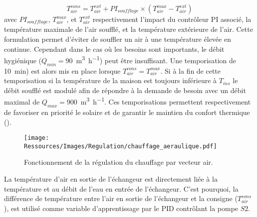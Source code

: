 \begin{equation}\label{eq:temp_soufflage}
    T_{air}^{cons} = T_{air}^{ext} + PI_{soufflage} \times (T_{air}^{max} - T_{air}^{ext})
\end{equation}
avec $PI_{soufflage}$, $T_{air}^{max}$, et $T_{air}^{ext}$ respectivement l’impact du
contrôleur PI associé, la température maximale de l’air soufflé, et la température
extérieure de l’air. Cette formulation permet d’éviter de souffler un air à une
température élevée en continue. Cependant dans le cas où les besoins sont importants, le
débit hygiénique ($Q_{min} = $\SI{90}{\meter\cubed\per\hour}) peut être insuffisant. Une
temporisation de \SI{10}{min}) est alors mis en place lorsque $T_{air}^{cons} =
T_{air}^{max}$. Si à la fin de cette temporisation si la température de la maison est
toujours inférieure à $T_{ins}$ le débit soufflé est modulé afin de répondre à la demande
de besoin avec un débit maximal de $Q_{max} = $\SI{900}{\meter\cubed\per\hour}. Ces
temporisations permettent respectivement de favoriser en priorité le solaire et de
garantir le maintien du confort thermique ().

\begin{figure}
    \begin{center}
        \texttt{[image: Ressources/Images/Regulation/chauffage\_aeraulique.pdf]}
    \end{center}
    \caption{Fonctionnement de la régulation du chauffage par vecteur air.
             \label{fig:chauffage_aeraulique}}
\end{figure}

La température d’air en sortie de l’échangeur est directement liée à la température et au
débit de l’eau en entrée de l’échangeur. C’est pourquoi, la différence de température
entre l’air en sortie de l’échangeur et la consigne ($T_{air}^{cons}$), est utilisé comme
variable d’apprentissage par le PID contrôlant la pompe $S2$.



